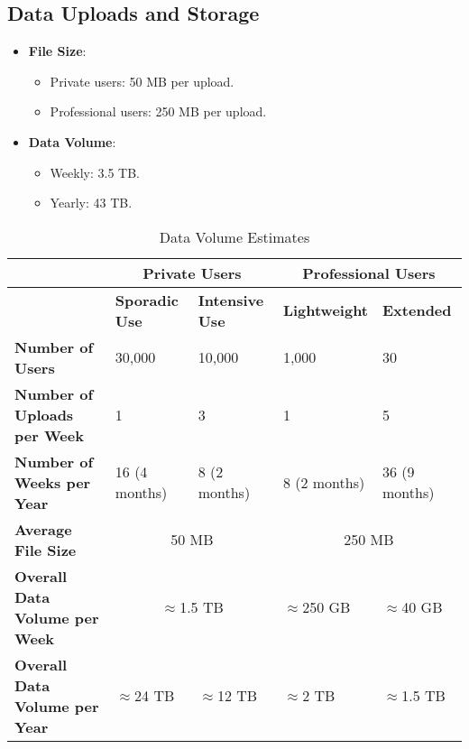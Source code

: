 \subsection*{Data Uploads and Storage}
\begin{itemize}
    \item \textbf{File Size}:
    \begin{itemize}
        \item Private users: 50 MB per upload.
        \item Professional users: 250 MB per upload.
    \end{itemize}
    \item \textbf{Data Volume}:
    \begin{itemize}
        \item Weekly: 3.5 TB.
        \item Yearly: 43 TB.
    \end{itemize}
\end{itemize}

\begin{center}
    \begin{table}[h]
        \centering
        \begin{tabular}{| p{4cm} | p{2cm} | p{2cm} | p{2cm} | p{2cm} |}
            \hline
            \textbf{} & \multicolumn{2}{c|}{\textbf{Private Users}} & \multicolumn{2}{c|}{\textbf{Professional Users}} \\
            \hline
            \textbf{} & \textbf{Sporadic Use} & \textbf{Intensive Use} & \textbf{Lightweight} & \textbf{Extended} \\
            \hline
            \textbf{Number of Users} & 30,000 & 10,000 & 1,000 & 30 \\
            \hline
            \textbf{Number of Uploads per Week} & 1 & 3 & 1 & 5 \\
            \hline
            \textbf{Number of Weeks per Year} & 16 \newline (4 months) & 8 \newline (2 months) & 8 \newline (2 months) & 36 \newline (9 months) \\
            \hline
            \textbf{Average File Size} & \multicolumn{2}{c|}{50 MB} & \multicolumn{2}{c|}{250 MB} \\
            \hline
            \textbf{Overall Data Volume per Week} & \multicolumn{2}{c|}{$\approx$1.5 TB} & $\approx$250 GB & $\approx$40 GB \\
            \hline
            \textbf{Overall Data Volume per Year} & $\approx$24 TB & $\approx$12 TB & $\approx$2 TB & $\approx$1.5 TB \\
            \hline
        \end{tabular}
        \caption{Data Volume Estimates}
        \label{table:data_volume}
    \end{table}
    
    
\end{center}

